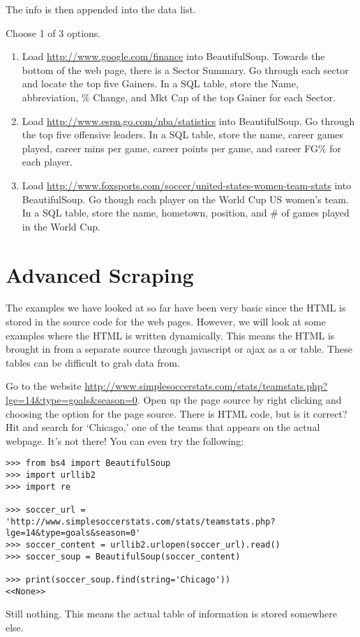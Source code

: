 The info is then appended into the data list.

\begin{problem}
Choose 1 of 3 options.
\begin{enumerate}
\item Load \url{http://www.google.com/finance} into BeautifulSoup.
Towards the bottom of the web page, there is a Sector Summary.
Go through each sector and locate the top five Gainers.
In a SQL table, store the Name, abbreviation, \% Change, and Mkt Cap of the top Gainer for each Sector.

\item Load \url{http://www.espn.go.com/nba/statistics} into BeautifulSoup.
Go through the top five offensive leaders.
In a SQL table, store the name, career games played, career mins per game, career points per game, and career FG\% for each player.

\item Load \url{http://www.foxsports.com/soccer/united-states-women-team-stats} into BeautifulSoup.
Go though each player on the World Cup US women's team.
In a SQL table, store the name, hometown, position, and \# of games played in the World Cup.
\end{enumerate}
\end{problem}

\section*{Advanced Scraping}
The examples we have looked at so far have been very basic since the HTML is stored in the source code for the web pages.
However, we will look at some examples where the HTML is written dynamically.
This means the HTML is brought in from a separate source through javascript or ajax as a  or  table.
These tables can be difficult to grab data from.

Go to the website \url{http://www.simplesoccerstats.com/stats/teamstats.php?lge=14&type=goals&season=0}.
Open up the page source by right clicking and choosing the option for the page source.
There is HTML code, but is it correct?
Hit  and search for `Chicago,' one of the teams that appears on the actual webpage.
It's not there!
You can even try the following:

\begin{lstlisting}
>>> from bs4 import BeautifulSoup
>>> import urllib2
>>> import re

>>> soccer_url = 'http://www.simplesoccerstats.com/stats/teamstats.php?lge=14&type=goals&season=0'
>>> soccer_content = urllib2.urlopen(soccer_url).read()
>>> soccer_soup = BeautifulSoup(soccer_content)

>>> print(soccer_soup.find(string='Chicago'))
<<None>>
\end{lstlisting}
Still nothing. This means the actual table of information is stored somewhere else.


